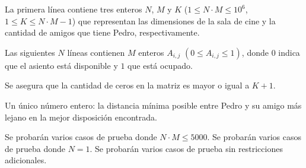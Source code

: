 \documentclass{oci}
\begin{document}
\begin{inputDescription}
La primera línea contiene tres enteros $N$, $M$ y $K$ ($1 \leq N \cdot M \leq 10^6$, $1 \leq K \leq N \cdot M - 1$) que representan las dimensiones de la sala de cine y la cantidad de amigos que tiene Pedro, respectivamente.

Las siguientes $N$ líneas contienen $M$ enteros $A_{i,j}$ $(0 \leq A_{i,j} \leq 1)$, donde $0$ indica que el asiento está disponible y $1$ que está ocupado.

Se asegura que la cantidad de ceros en la matriz es mayor o igual a $K+1$.
\end{inputDescription}

\begin{outputDescription}
Un único número entero: la distancia mínima posible entre Pedro y su amigo más lejano en la mejor disposición encontrada.
\end{outputDescription}

\begin{scoreDescription}
   Se probarán varios casos de prueba donde $N \cdot M \leq 5000$.
   Se probarán varios casos de prueba donde $N = 1$.
   Se probarán varios casos de prueba sin restricciones adicionales.
\end{scoreDescription}

\begin{sampleDescription}
\end{sampleDescription}
\end{document}
